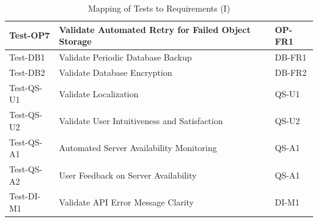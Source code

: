 \documentclass[12pt, titlepage]{article}
\begin{document}
\begin{table}[htpb!]
\begin{tabular}{|l|p{8cm}|p{3cm}|}
    \hline
    Test-OP7         & Validate Automated Retry for Failed Object Storage & OP-FR1                \\
    \hline
    Test-DB1         & Validate Periodic Database Backup                  & DB-FR1                \\
    \hline
    Test-DB2         & Validate Database Encryption                       & DB-FR2                \\
    \hline
    Test-QS-U1       & Validate Localization                              & QS-U1                 \\
    \hline
    Test-QS-U2       & Validate User Intuitiveness and Satisfaction       & QS-U2                 \\
    \hline
    Test-QS-A1       & Automated Server Availability Monitoring           & QS-A1                 \\
    \hline
    Test-QS-A2       & User Feedback on Server Availability               & QS-A1                 \\
    \hline
    Test-DI-M1       & Validate API Error Message Clarity                 & DI-M1                 \\
    \hline
  \end{tabular}
  \caption{Mapping of Tests to Requirements (I)}
  \label{tab:test_requirements1}
\end{table}
\end{document}
